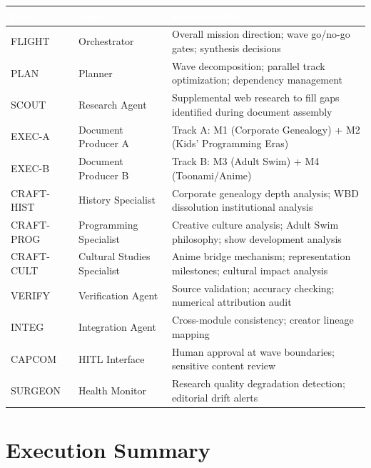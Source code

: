 \documentclass[11pt,letterpaper]{article}
\newcommand{\tableheader}[1]{\textbf{\sffamily\textcolor{white}{#1}}}
\begin{document}
\begin{center}
\begin{tabularx}{\textwidth}{L{2cm}L{3cm}X}
\toprule
{}
\tableheader{Role} & \tableheader{Agent} & \tableheader{Responsibility} \\
\midrule
FLIGHT & Orchestrator & Overall mission direction; wave go/no-go gates; synthesis decisions \\
PLAN & Planner & Wave decomposition; parallel track optimization; dependency management \\
SCOUT & Research Agent & Supplemental web research to fill gaps identified during document assembly \\
EXEC-A & Document Producer A & Track A: M1 (Corporate Genealogy) + M2 (Kids' Programming Eras) \\
EXEC-B & Document Producer B & Track B: M3 (Adult Swim) + M4 (Toonami/Anime) \\
CRAFT-HIST & History Specialist & Corporate genealogy depth analysis; WBD dissolution institutional analysis \\
CRAFT-PROG & Programming Specialist & Creative culture analysis; Adult Swim philosophy; show development analysis \\
CRAFT-CULT & Cultural Studies Specialist & Anime bridge mechanism; representation milestones; cultural impact analysis \\
VERIFY & Verification Agent & Source validation; accuracy checking; numerical attribution audit \\
INTEG & Integration Agent & Cross-module consistency; creator lineage mapping \\
CAPCOM & HITL Interface & Human approval at wave boundaries; sensitive content review \\
SURGEON & Health Monitor & Research quality degradation detection; editorial drift alerts \\
\bottomrule
\end{tabularx}
\end{center}

\section{Execution Summary}
\end{document}
